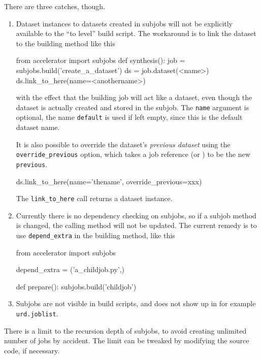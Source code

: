 There are three catches, though.
\begin{enumerate}
\item
Dataset instances to datasets created in subjobs will not be
explicitly available to the ``to level'' build script.  The workaround
is to link the dataset to the building method like this
\begin{python}
from accelerator import subjobs
def synthesis():
    job = subjobs.build('create_a_dataset')
    ds = job.dataset(<name>)
    ds.link_to_here(name=<anothername>)
\end{python}
with the effect that the building job will act like a dataset, even
though the dataset is actually created and stored in the subjob.  The
\texttt{name} argument is optional, the name \texttt{default} is used
if left empty, since this is the default dataset name.

It is also possible to override the dataset's \textsl{previous
dataset} using the \texttt{override\_previous} option, which takes a
job reference (or \pyNone) to be the
new \texttt{previous}.  
\begin{python}
    ds.link_to_here(name='thename', override_previous=xxx)
\end{python}
The \texttt{link\_to\_here} call returns a dataset instance.

\item
Currently there is no dependency checking on subjobs, so if a subjob
method is changed, the calling method will not be updated.  The
current remedy is to use \texttt{depend\_extra} in the building
method, like this
\begin{python}
from accelerator import subjobs

depend_extra = ('a_childjob.py',)

def prepare():
    subjobs.build('childjob')
\end{python}

\item
  Subjobs are not visible in build scripts, and does not show up in
  for example \texttt{urd.joblist}.

\end{enumerate}
There is a limit to the recursion depth of subjobs, to avoid creating
unlimited number of jobs by accident.  The limit can be tweaked by
modifying the source code, if necessary.



